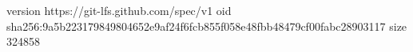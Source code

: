 version https://git-lfs.github.com/spec/v1
oid sha256:9a5b223179849804652e9af24f6fcb855f058e48fbb48479cf00fabc28903117
size 324858

